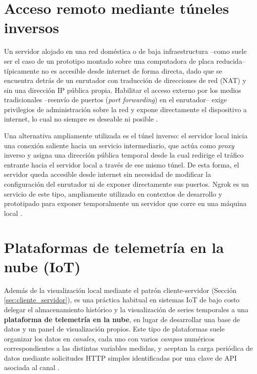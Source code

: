 \section{Acceso remoto mediante túneles inversos}
\label{sec:tunel_inverso}

Un servidor alojado en una red doméstica o de baja infraestructura --como suele ser el caso de un prototipo montado sobre una computadora de placa reducida-- típicamente no es accesible desde internet de forma directa, dado que se encuentra detrás de un enrutador con traducción de direcciones de red (NAT) y sin una dirección IP pública propia. Habilitar el acceso externo por los medios tradicionales --reenvío de puertos (\textit{port forwarding}) en el enrutador-- exige privilegios de administración sobre la red y expone directamente el dispositivo a internet, lo cual no siempre es deseable ni posible \cite{kurose_ross2021}.

Una alternativa ampliamente utilizada es el túnel inverso: el servidor local inicia una conexión saliente hacia un servicio intermediario, que actúa como \textit{proxy} inverso y asigna una dirección pública temporal desde la cual redirige el tráfico entrante hacia el servidor local a través de ese mismo túnel. De esta forma, el servidor queda accesible desde internet sin necesidad de modificar la configuración del enrutador ni de exponer directamente sus puertos. Ngrok es un servicio de este tipo, ampliamente utilizado en contextos de desarrollo y prototipado para exponer temporalmente un servidor que corre en una máquina local \cite{ngrok_docs}.

\section{Plataformas de telemetría en la nube (IoT)}
\label{sec:telemetria_nube}

Además de la visualización local mediante el patrón cliente-servidor (Sección \ref{sec:cliente_servidor}), es una práctica habitual en sistemas IoT de bajo costo delegar el almacenamiento histórico y la visualización de series temporales a una \textbf{plataforma de telemetría en la nube}, en lugar de desarrollar una base de datos y un panel de visualización propios. Este tipo de plataformas suele organizar los datos en \textit{canales}, cada uno con varios \textit{campos} numéricos correspondientes a las distintas variables medidas, y aceptan la carga periódica de datos mediante solicitudes HTTP simples identificadas por una clave de API asociada al canal \cite{thingspeak_mathworks}.

